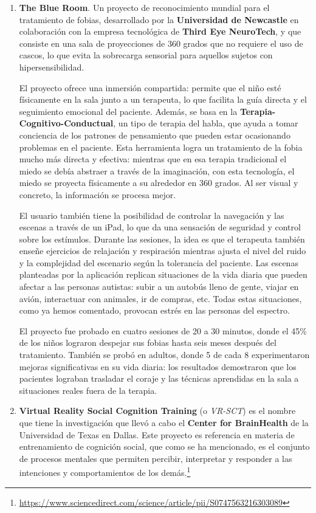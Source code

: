 \documentclass[12pt,twoside,titlepage]{report}
\begin{document}
\begin{enumerate}[label=\textbf{\arabic*.}, leftmargin=1.5cm, itemsep=0.5em]
  \item \textbf{The Blue Room}.
Un proyecto de reconocimiento mundial para el tratamiento de fobias, desarrollado por la \textbf{Universidad de Newcastle} en colaboración con la empresa tecnológica de \textbf{Third Eye NeuroTech}, y que consiste en una sala de proyecciones de 360 grados que no requiere el uso de cascos, lo que evita la sobrecarga sensorial para aquellos sujetos con hipersensibilidad.

  El proyecto ofrece una inmersión compartida: permite que el niño esté físicamente en la sala junto a un terapeuta, lo que facilita la guía directa y el seguimiento emocional del paciente.
Además, se basa en la \textbf{Terapia-Cognitivo-Conductual}, un tipo de terapia del habla, que ayuda a tomar conciencia de los patrones de pensamiento que pueden estar ocasionando problemas en el paciente.
Esta herramienta logra un tratamiento de la fobia mucho más directa y efectiva: mientras que en esa terapia tradicional el miedo se debía abstraer a través de la imaginación, con esta tecnología, el miedo se proyecta físicamente a su alrededor en 360 grados.
Al ser visual y concreto, la información se procesa mejor.

  El usuario también tiene la posibilidad de controlar la navegación y las escenas a través de un iPad, lo que da una sensación de seguridad y control sobre los estímulos.
Durante las sesiones, la idea es que el terapeuta también enseñe ejercicios de relajación y respiración mientras ajusta el nivel del ruido y la complejidad del escenario según la tolerancia del paciente.
Las escenas planteadas por la aplicación replican situaciones de la vida diaria que pueden afectar a las personas autistas: subir a un autobús lleno de gente, viajar en avión, interactuar con animales, ir de compras, etc. Todas estas situaciones, como ya hemos comentado, provocan estrés en las personas del espectro.

  El proyecto fue probado en cuatro sesiones de 20 a 30 minutos, donde el 45\% de los niños lograron despejar sus fobias hasta seis meses después del tratamiento.
También se probó en adultos, donde 5 de cada 8 experimentaron mejoras significativas en su vida diaria: los resultados demostraron que los pacientes lograban trasladar el coraje y las técnicas aprendidas en la sala a situaciones reales fuera de la terapia.

  \item \textbf{Virtual Reality Social Cognition Training} (o \textit{VR-SCT}) es el nombre que tiene la investigación que llevó a cabo el \textbf{Center for BrainHealth} de la Universidad de Texas en Dallas.
Este proyecto es referencia en materia de entrenamiento de cognición social, que como se ha mencionado, es el conjunto de procesos mentales que permiten percibir, interpretar y responder a las intenciones y comportamientos de los demás.\footnote{\url{https://www.sciencedirect.com/science/article/pii/S0747563216303089}}


\end{enumerate}
\end{document}
